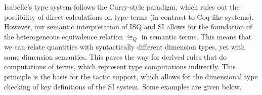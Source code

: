 \documentclass[11pt,a4paper]{book}
\begin{document}
Isabelle's type system follows the Curry-style paradigm, which rules out the possibility of direct calculations on
type-terms (in contrast to Coq-like systems). However, our semantic interpretation of ISQ and SI allows for the
foundation of the heterogeneous equivalence relation $\cong_{Q}$ in semantic terms. This means that we can relate
quantities with syntactically different dimension types, yet with same dimension semantics. This paves the way for
derived rules that do computations of terms, which represent type computations indirectly. This principle is the basis
for the tactic support, which allows for the dimensional type checking of key definitions of the SI system. Some
examples are given below.

\begin{isamarkuptext}%
%
\end{isamarkuptext}\isamarkuptrue%
\end{document}
